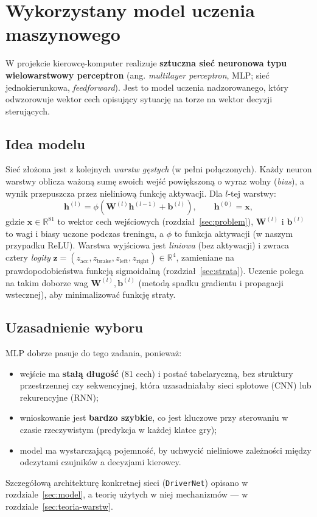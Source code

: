 \documentclass[11pt,a4paper]{article}
\begin{document}
\section{Wykorzystany model uczenia maszynowego}
\label{sec:model-overview}

W projekcie kierowcę-komputer realizuje \textbf{sztuczna sieć neuronowa typu
wielowarstwowy perceptron} (ang. \emph{multilayer perceptron}, MLP; sieć
jednokierunkowa, \emph{feedforward}). Jest to model uczenia nadzorowanego, który
odwzorowuje wektor cech opisujący sytuację na torze na wektor decyzji sterujących.

\subsection{Idea modelu}

Sieć złożona jest z kolejnych \emph{warstw gęstych} (w pełni połączonych). Każdy
neuron warstwy oblicza ważoną sumę swoich wejść powiększoną o wyraz wolny (\emph{bias}),
a wynik przepuszcza przez nieliniową funkcję aktywacji. Dla $l$-tej warstwy:
\begin{equation}
\mathbf{h}^{(l)} = \phi\!\left(\mathbf{W}^{(l)}\mathbf{h}^{(l-1)} + \mathbf{b}^{(l)}\right),
\qquad \mathbf{h}^{(0)} = \mathbf{x},
\label{eq:forward}
\end{equation}
gdzie $\mathbf{x}\in\mathbb{R}^{81}$ to wektor cech wejściowych (rozdział~\ref{sec:problem}),
$\mathbf{W}^{(l)}$ i $\mathbf{b}^{(l)}$ to wagi i biasy uczone podczas treningu, a
$\phi$ to funkcja aktywacji (w naszym przypadku ReLU). Warstwa wyjściowa jest
\emph{liniowa} (bez aktywacji) i zwraca cztery \emph{logity}
$\mathbf{z}=(z_\text{acc}, z_\text{brake}, z_\text{left}, z_\text{right})\in\mathbb{R}^4$,
zamieniane na prawdopodobieństwa funkcją sigmoidalną (rozdział~\ref{sec:strata}).
Uczenie polega na takim doborze wag $\mathbf{W}^{(l)}, \mathbf{b}^{(l)}$ (metodą
spadku gradientu i propagacji wstecznej), aby minimalizować funkcję straty.

\subsection{Uzasadnienie wyboru}

MLP dobrze pasuje do tego zadania, ponieważ:
\begin{itemize}[noitemsep]
  \item wejście ma \textbf{stałą długość} (81 cech) i postać tabelaryczną, bez
        struktury przestrzennej czy sekwencyjnej, która uzasadniałaby sieci
        splotowe (CNN) lub rekurencyjne (RNN);
  \item wnioskowanie jest \textbf{bardzo szybkie}, co jest kluczowe przy
        sterowaniu w czasie rzeczywistym (predykcja w każdej klatce gry);
  \item model ma wystarczającą pojemność, by uchwycić nieliniowe zależności między
        odczytami czujników a decyzjami kierowcy.
\end{itemize}
Szczegółową architekturę konkretnej sieci (\texttt{DriverNet}) opisano w
rozdziale~\ref{sec:model}, a teorię użytych w niej mechanizmów --- w
rozdziale~\ref{sec:teoria-warstw}.
\end{document}
